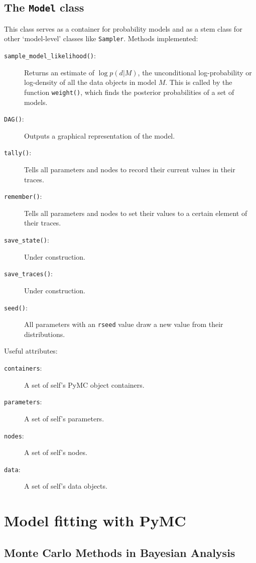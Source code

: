\documentclass[]{book}
\begin{document}
\section{The \texttt{Model} class} \label{sec:Model} 
This class serves as a container for probability models and as a stem class for other `model-level' classes like \texttt{Sampler}. Methods implemented:
\begin{description}
	\item[\texttt{sample\_model\_likelihood()}:] Returns an estimate of $\log p(d|M)$, the unconditional log-probability or log-density of all the data objects in model $M$. This is called by the function \texttt{weight()}, which finds the posterior probabilities of a set of models.
	\item[\texttt{DAG()}:] Outputs a graphical representation of the model.
	\item[\texttt{tally()}:] Tells all parameters and nodes to record their current values in their traces.
	\item[\texttt{remember()}:] Tells all parameters and nodes to set their values to a certain element of their traces.
	\item[\texttt{save\_state()}:] Under construction.
	\item[\texttt{save\_traces()}:] Under construction.
	\item[\texttt{seed()}:] All parameters with an \texttt{rseed} value draw a new value from their distributions.
\end{description}

Useful attributes:
\begin{description}
	\item[\texttt{containers}:] A set of self's PyMC object containers.
	\item[\texttt{parameters}:] A set of self's parameters.
	\item[\texttt{nodes}:] A set of self's nodes.
	\item[\texttt{data}:] A set of self's data objects.
\end{description}

\chapter{Model fitting with PyMC} %
\label{chap:MCMC}


\section{Monte Carlo Methods in Bayesian Analysis}
\end{document}
